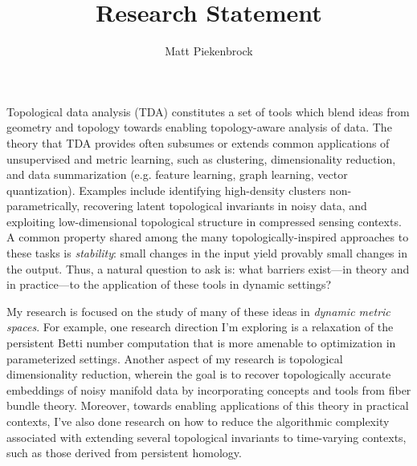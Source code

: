 \documentclass[10pt]{article}
\title{\vspace{-2.0em} Research Statement\vspace{-0.5em}}
\author{Matt Piekenbrock}
\date{}
\begin{document}
 \vspace{-2em} \maketitle \vspace{-1em}
Topological data analysis (TDA) constitutes a set of tools which blend ideas from geometry and topology towards enabling topology-aware analysis of data. The theory that TDA provides often subsumes or extends common applications of unsupervised and metric learning, such as clustering, dimensionality reduction, and data summarization (e.g. feature learning, graph learning, vector quantization). 
Examples include identifying high-density clusters non-parametrically, recovering latent topological invariants in noisy data, and exploiting low-dimensional topological structure in compressed sensing contexts. 
A common property shared among the many topologically-inspired approaches to these tasks is \emph{stability}: small changes in the input yield provably small changes in the output. Thus, a natural question to ask is: what barriers exist---in theory and in practice---to the application of these tools in dynamic settings?

My research is focused on the study of many of these ideas in \emph{dynamic metric spaces}. For example, one research direction I'm exploring is a relaxation of the persistent Betti number computation that is more amenable to optimization in parameterized settings. 
Another aspect of my research is topological dimensionality reduction, wherein the goal is to recover topologically accurate embeddings of noisy manifold data by incorporating concepts and tools from fiber bundle theory. 
Moreover, towards enabling applications of this theory in practical contexts, I've also done research on how to reduce the algorithmic complexity associated with extending several topological invariants to time-varying contexts, such as those derived from persistent homology. 
\end{document}
